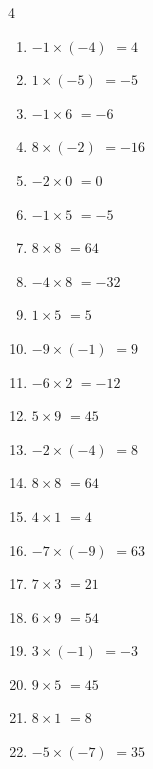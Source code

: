 \begin{multicols}{4}
\begin{enumerate}
  \item $-1\times (-4)$
        $=4$

  \item $1\times (-5)$
        $=-5$

  \item $-1\times 6$
        $=-6$

  \item $8\times (-2)$
        $=-16$

  \item $-2\times 0$
        $=0$

  \item $-1\times 5$
        $=-5$

  \item $8\times 8$
        $=64$

  \item $-4\times 8$
        $=-32$

  \item $1\times 5$
        $=5$

  \item $-9\times (-1)$
        $=9$

  \item $-6\times 2$
        $=-12$

  \item $5\times 9$
        $=45$

  \item $-2\times (-4)$
        $=8$

  \item $8\times 8$
        $=64$

  \item $4\times 1$
        $=4$

  \item $-7\times (-9)$
        $=63$

  \item $7\times 3$
        $=21$

  \item $6\times 9$
        $=54$

\columnbreak %

  \item $3\times (-1)$
        $=-3$

  \item $9\times 5$
        $=45$

  \item $8\times 1$
        $=8$

  \item $-5\times (-7)$
        $=35$


\end{enumerate}
\end{multicols}
